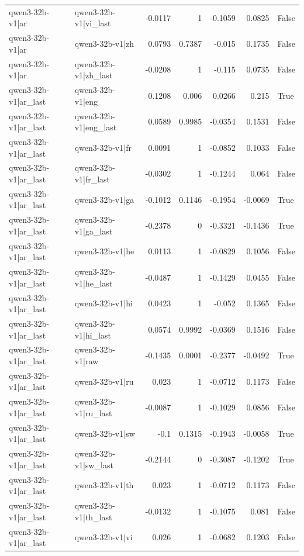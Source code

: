 \begin{table}
\begin{tabular}{l l r r r r l}
qwen3-32b-v1|ar & qwen3-32b-v1|vi_last & -0.0117 & 1 & -0.1059 & 0.0825 & False \\
qwen3-32b-v1|ar & qwen3-32b-v1|zh & 0.0793 & 0.7387 & -0.015 & 0.1735 & False \\
qwen3-32b-v1|ar & qwen3-32b-v1|zh_last & -0.0208 & 1 & -0.115 & 0.0735 & False \\
qwen3-32b-v1|ar_last & qwen3-32b-v1|eng & 0.1208 & 0.006 & 0.0266 & 0.215 & True \\
qwen3-32b-v1|ar_last & qwen3-32b-v1|eng_last & 0.0589 & 0.9985 & -0.0354 & 0.1531 & False \\
qwen3-32b-v1|ar_last & qwen3-32b-v1|fr & 0.0091 & 1 & -0.0852 & 0.1033 & False \\
qwen3-32b-v1|ar_last & qwen3-32b-v1|fr_last & -0.0302 & 1 & -0.1244 & 0.064 & False \\
qwen3-32b-v1|ar_last & qwen3-32b-v1|ga & -0.1012 & 0.1146 & -0.1954 & -0.0069 & True \\
qwen3-32b-v1|ar_last & qwen3-32b-v1|ga_last & -0.2378 & 0 & -0.3321 & -0.1436 & True \\
qwen3-32b-v1|ar_last & qwen3-32b-v1|he & 0.0113 & 1 & -0.0829 & 0.1056 & False \\
qwen3-32b-v1|ar_last & qwen3-32b-v1|he_last & -0.0487 & 1 & -0.1429 & 0.0455 & False \\
qwen3-32b-v1|ar_last & qwen3-32b-v1|hi & 0.0423 & 1 & -0.052 & 0.1365 & False \\
qwen3-32b-v1|ar_last & qwen3-32b-v1|hi_last & 0.0574 & 0.9992 & -0.0369 & 0.1516 & False \\
qwen3-32b-v1|ar_last & qwen3-32b-v1|raw & -0.1435 & 0.0001 & -0.2377 & -0.0492 & True \\
qwen3-32b-v1|ar_last & qwen3-32b-v1|ru & 0.023 & 1 & -0.0712 & 0.1173 & False \\
qwen3-32b-v1|ar_last & qwen3-32b-v1|ru_last & -0.0087 & 1 & -0.1029 & 0.0856 & False \\
qwen3-32b-v1|ar_last & qwen3-32b-v1|sw & -0.1 & 0.1315 & -0.1943 & -0.0058 & True \\
qwen3-32b-v1|ar_last & qwen3-32b-v1|sw_last & -0.2144 & 0 & -0.3087 & -0.1202 & True \\
qwen3-32b-v1|ar_last & qwen3-32b-v1|th & 0.023 & 1 & -0.0712 & 0.1173 & False \\
qwen3-32b-v1|ar_last & qwen3-32b-v1|th_last & -0.0132 & 1 & -0.1075 & 0.081 & False \\
qwen3-32b-v1|ar_last & qwen3-32b-v1|vi & 0.026 & 1 & -0.0682 & 0.1203 & False \\

\end{tabular}
\end{table}
